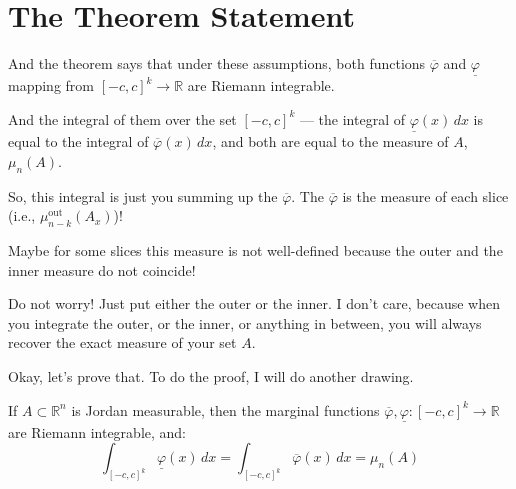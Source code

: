 \section{The Theorem Statement}

\begin{spoken-clean}[00:04:50 - 00:07:30]
And the theorem says that under these assumptions, both functions $\overline{\varphi}$ and $\underline{\varphi}$ mapping from $[-c,c]^k \to \mathbb{R}$ are Riemann integrable. 

And the integral of them over the set $[-c, c]^k$ — the integral of $\underline{\varphi}(x)\,dx$ is equal to the integral of $\overline{\varphi}(x)\,dx$, and both are equal to the measure of $A$, $\mu_n(A)$.

So, this integral is just you summing up the $\overline{\varphi}$. The $\overline{\varphi}$ is the measure of each slice (i.e., $\mu_{n-k}^{\text{out}}(A_x)$)! 
\end{spoken-clean}

\begin{student-question}
Maybe for some slices this measure is not well-defined because the outer and the inner measure do not coincide!
\end{student-question}

\begin{spoken-clean}[00:06:15 - 00:07:30]
Do not worry! Just put either the outer or the inner. I don't care, because when you integrate the outer, or the inner, or anything in between, you will always recover the exact measure of your set $A$. 

Okay, let's prove that. To do the proof, I will do another drawing.
\end{spoken-clean}

\begin{nice-box}
\begin{theorem}
If $A \subset \mathbb{R}^n$ is Jordan measurable, then the marginal functions $\overline{\varphi}, \underline{\varphi} : [-c, c]^k \to \mathbb{R}$ are Riemann integrable, and:
\[
\int_{[-c,c]^k} \underline{\varphi}(x) \, dx = \int_{[-c,c]^k} \overline{\varphi}(x) \, dx = \mu_n(A)
\]
\end{theorem}
\end{nice-box}

